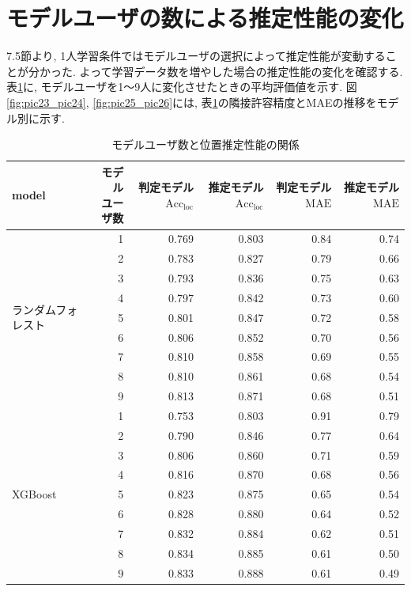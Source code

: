 \documentclass[a4paper,12pt]{jreport}
\begin{document}
\section{モデルユーザの数による推定性能の変化}
7.5節より, 1人学習条件ではモデルユーザの選択によって推定性能が変動することが分かった.  よって学習データ数を増やした場合の推定性能の変化を確認する. 表\ref{tab:num_model_loc}に, モデルユーザを1〜9人に変化させたときの平均評価値を示す. 図\ref{fig:pic23_pic24}, \ref{fig:pic25_pic26}には, 表\ref{tab:num_model_loc}の隣接許容精度とMAEの推移をモデル別に示す. 

\begin{table}[tb]
  \centering
  \caption{モデルユーザ数と位置推定性能の関係}
  \label{tab:num_model_loc}
  \renewcommand{\arraystretch}{1.15}
  \small
  \begin{tabular}{|l|r|r|r|r|r|}
    \hline
    model &
    \makecell{モデル\\ユーザ数} &
    \makecell{判定モデル\\$\mathrm{Acc}_{\mathrm{loc}}$} &
    \makecell{推定モデル\\$\mathrm{Acc}_{\mathrm{loc}}$} &
    \makecell{判定モデル\\$\mathrm{MAE}$} &
    \makecell{推定モデル\\$\mathrm{MAE}$} \\ \hline

    \multirow{9}{*}{ランダムフォレスト} & 1 & 0.769 & 0.803 & 0.84 & 0.74 \\ \cline{2-6}
     & 2 & 0.783 & 0.827 & 0.79 & 0.66 \\ \cline{2-6}
     & 3 & 0.793 & 0.836 & 0.75 & 0.63 \\ \cline{2-6}
     & 4 & 0.797 & 0.842 & 0.73 & 0.60 \\ \cline{2-6}
     & 5 & 0.801 & 0.847 & 0.72 & 0.58 \\ \cline{2-6}
     & 6 & 0.806 & 0.852 & 0.70 & 0.56 \\ \cline{2-6}
     & 7 & 0.810 & 0.858 & 0.69 & 0.55 \\ \cline{2-6}
     & 8 & 0.810 & 0.861 & 0.68 & 0.54 \\ \cline{2-6}
     & 9 & 0.813 & 0.871 & 0.68 & 0.51 \\ \hline

    \multirow{9}{*}{XGBoost} & 1 & 0.753 & 0.803 & 0.91 & 0.79 \\ \cline{2-6}
     & 2 & 0.790 & 0.846 & 0.77 & 0.64 \\ \cline{2-6}
     & 3 & 0.806 & 0.860 & 0.71 & 0.59 \\ \cline{2-6}
     & 4 & 0.816 & 0.870 & 0.68 & 0.56 \\ \cline{2-6}
     & 5 & 0.823 & 0.875 & 0.65 & 0.54 \\ \cline{2-6}
     & 6 & 0.828 & 0.880 & 0.64 & 0.52 \\ \cline{2-6}
     & 7 & 0.832 & 0.884 & 0.62 & 0.51 \\ \cline{2-6}
     & 8 & 0.834 & 0.885 & 0.61 & 0.50 \\ \cline{2-6}
     & 9 & 0.833 & 0.888 & 0.61 & 0.49 \\ \hline
  \end{tabular}
\end{table}
\end{document}
